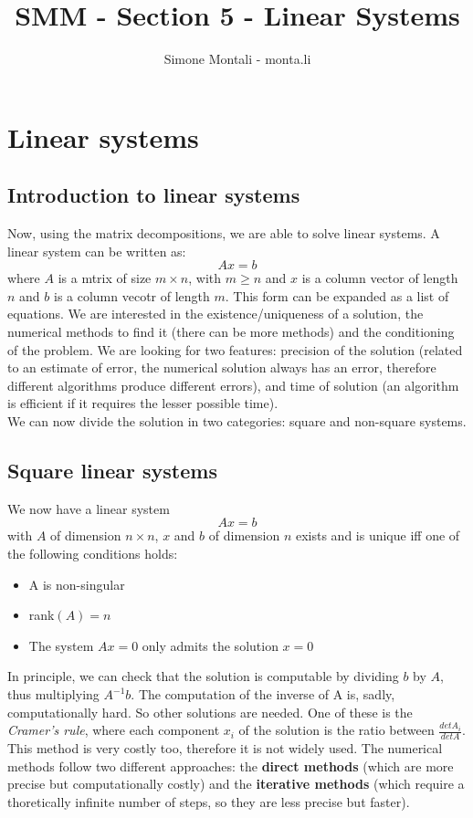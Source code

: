 \documentclass[11pt]{article}
\begin{document}
\author{Simone Montali - monta.li}
\title{SMM - Section 5 - Linear Systems}

\maketitle

\medskip
\section{Linear systems}
\subsection{Introduction to linear systems}
Now, using the matrix decompositions, we are able to solve linear systems. A linear system can be written as:
\begin{displaymath}
    Ax = b
\end{displaymath}
where $A$ is a mtrix of size $m \times n$, with $m\ge n$ and $x$ is a column vector of length $n$ and $b$ is a column vecotr of length $m$. This form can be expanded as a list of equations. We are interested in the existence/uniqueness of a solution, the numerical methods to find it (there can be more methods) and the conditioning of the problem. We are looking for two features: precision of the solution (related to an estimate of error, the numerical solution always has an error, therefore different algorithms produce different errors), and time of solution (an algorithm is efficient if it requires the lesser possible time). \\
We can now divide the solution in two categories: square and non-square systems.
\subsection{Square linear systems}
We now have a linear system
\begin{displaymath}
    Ax = b
\end{displaymath}
with $A$ of dimension $n \times n$, $x$ and $b$ of dimension $n$ exists and is unique iff one of the following conditions holds: 
\begin{itemize}
    \item A is non-singular
    \item rank$(A) = n$
    \item The system $Ax=0$ only admits the solution $x=0$
\end{itemize}
In principle, we can check that the solution is computable by dividing $b$ by $A$, thus multiplying $A^{-1}b$. The computation of the inverse of A is, sadly, computationally hard. So other solutions are needed. One of these is the \textit{Cramer's rule}, where each component $x_i$ of the solution is the ratio between $\frac{detA_i}{detA}$. This method is very costly too, therefore it is not widely used. The numerical methods follow two different approaches: the \textbf{direct methods} (which are more precise but computationally costly) and the \textbf{iterative methods} (which require a thoretically infinite number of steps, so they are less precise but faster).
\end{document}
